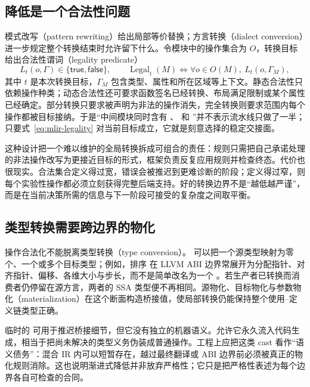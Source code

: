 \subsection{降低是一个合法性问题}

模式改写（pattern rewriting）给出局部等价替换；方言转换（dialect conversion）进一步规定整个转换结束时允许留下什么。令模块中的操作集合为 $O$，转换目标给出合法性谓词（legality predicate）
\begin{equation}
  L_t(o,\Gamma)\in\{\mathsf{true},\mathsf{false}\},
  \qquad
  \operatorname{Legal}_t(M)\iff
  \forall o\in O(M),\ L_t(o,\Gamma_M),
  \label{eq:mlir-legality}
\end{equation}
其中 $t$ 是本次转换目标，$\Gamma_M$ 包含类型、属性和所在区域等上下文。静态合法性只依赖操作种类；动态合法性还可要求函数签名已经转换、布局满足限制或某个属性已经确定。部分转换只要求被声明为非法的操作消失，完全转换则要求范围内每个操作都被目标接纳\cite{adv-mlir-conversion}。于是“中间模块同时含有 、 和 ”并不表示流水线只做了一半；只要式~\eqref{eq:mlir-legality} 对当前目标成立，它就是刻意选择的稳定交接面。

这种设计把一个难以维护的全局转换拆成可组合的责任：规则只需把自己承诺处理的非法操作改写为更接近目标的形式，框架负责反复应用规则并检查终态。代价也很现实。合法集合定义得过宽，错误会被推迟到更难诊断的阶段；定义得过窄，则每个实验性操作都必须立刻获得完整后端支持。好的转换边界不是“越低越严谨”，而是在当前决策所需的信息与下一阶段可接受的复杂度之间取平衡。

\subsection{类型转换需要跨边界的物化}

操作合法化不能脱离类型转换（type conversion）。 可以把一个源类型映射为零个、一个或多个目标类型；例如，排序  在 LLVM ABI 边界常展开为分配指针、对齐指针、偏移、各维大小与步长，而不是简单改名为一个 \cite{adv-mlir-conversion,adv-mlir-llvm-target}。若生产者已转换而消费者仍停留在源方言，两者的 SSA 类型便不再相同。源物化、目标物化与参数物化（materialization）在这个断面构造桥接值，使局部转换仍能保持整个使用--定义链类型正确。

临时的  可用于推迟桥接细节，但它没有独立的机器语义。允许它永久流入代码生成，相当于把尚未解决的类型义务伪装成普通操作。工程上应把这类 cast 看作“语义债务”：混合 IR 内可以短暂存在，越过最终翻译或 ABI 边界前必须被真正的物化规则消除。这也说明渐进式降低并非放弃严格性；它只是把严格性表述为每个边界各自可检查的合同。

